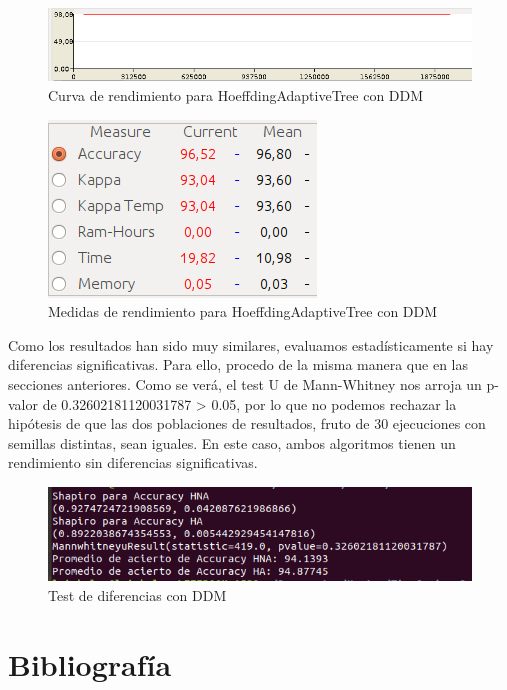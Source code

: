 \begin{figure}[H] %
	\centering
	\includegraphics[scale=0.5]{graph52.png}  %
	\caption{Curva de rendimiento para HoeffdingAdaptiveTree con DDM} 
	\label{fig:graph52}
\end{figure}

\begin{figure}[H] %
	\centering
	\includegraphics[scale=0.5]{measures52.png}  %
	\caption{Medidas de rendimiento para HoeffdingAdaptiveTree con DDM} 
	\label{fig:measure52}
\end{figure}

Como los resultados han sido muy similares, evaluamos estadísticamente si hay diferencias significativas. Para ello, procedo de la misma manera que en las secciones anteriores. Como se verá, el test U de Mann-Whitney nos arroja un p-valor de 
0.32602181120031787 > 0.05, por lo que no podemos rechazar la hipótesis de que las dos poblaciones de resultados, fruto de 30 ejecuciones con semillas distintas, sean iguales. En este caso, ambos algoritmos tienen un rendimiento sin diferencias significativas.

\begin{figure}[H] %
	\centering
	\includegraphics[scale=0.5]{test5.png}  %
	\caption{Test de diferencias con DDM} 
	\label{fig:test5}
\end{figure}
\newpage
\section{Bibliografía}




